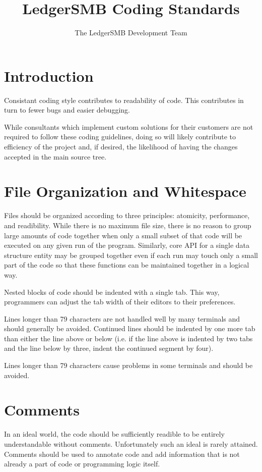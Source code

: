 \documentclass{article}
\title{LedgerSMB Coding Standards}
\author{The LedgerSMB Development Team}
\begin{document}
\maketitle

\tableofcontents

\section{Introduction}
Consistant coding style contributes to readability of code.  This contributes in
turn to fewer bugs and easier debugging.

While consultants which implement custom solutions for their customers are not
required to follow these coding guidelines, doing so will likely contribute to
efficiency of the project and, if desired, the likelihood of having the changes
accepted in the main source tree.

\section{File Organization and Whitespace}

Files should be organized according to three principles: atomicity, performance,
and readibility.  While there is no maximum file size, there is no reason to
group large amounts of code together when only a small subset of that code will
be executed on any given run of the program.  Similarly, core API for a single
data structure entity may be grouped together even if each run may touch only a
small part of the code so that these functions can be maintained together in a
logical way.

Nested blocks of code should be indented with a single tab.  This way,
programmers can adjust the tab width of their editors to their preferences.

Lines longer than 79 characters are not handled well by many terminals and
should generally be avoided.  Continued lines should be indented by one more tab
than either the line above or below (i.e. if the line above is indented by two
tabs and the line below by three, indent the continued segment by four).

Lines longer than 79 characters cause problems in some terminals and should be
avoided.

\section{Comments}

In an ideal world, the code should be sufficiently readible to be entirely
understandable without comments.  Unfortunately such an ideal is rarely
attained.  Comments should be used to annotate code and add information that is
not already a part of code or programming logic itself.  
\end{document}
